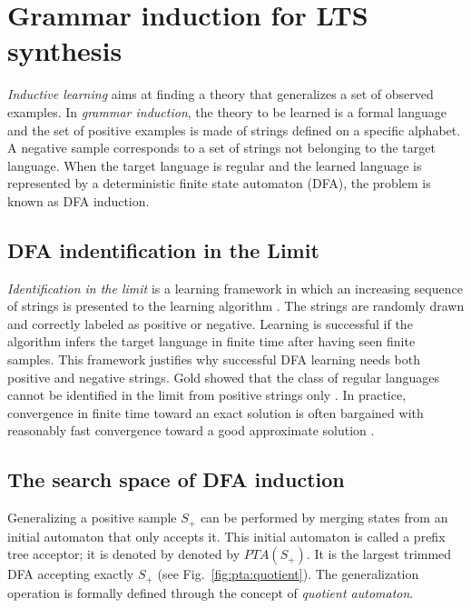\section{Grammar induction for LTS synthesis\label{section:inductive-background}}

\emph{Inductive learning} aims at finding a theory that generalizes a set of observed examples. In \emph{grammar induction}, the theory to be learned is a formal language and the set of positive examples is made of strings defined on a specific alphabet. A negative sample corresponds to a set of strings not belonging to the target language. When the target language
is regular and the learned language is represented by a deterministic finite state automaton (DFA), the problem is known as DFA induction.

\subsection{DFA indentification in the Limit}

\emph{Identification in the limit} is a learning framework in which an increasing sequence of strings is presented to the learning algorithm \cite{Gold:1967}. The strings are randomly drawn and correctly labeled as positive or negative. Learning is successful if the algorithm infers the target language in finite time after having seen finite samples. This framework justifies why successful DFA learning needs both positive and negative strings. Gold showed that the class of regular languages cannot be identified in the limit from positive strings only \cite{Gold:1967}. In practice, convergence in finite time toward an exact solution is often bargained with reasonably fast convergence toward a good approximate solution \cite{Lang:1992}.

\subsection{The search space of DFA induction\label{subsection:gi-background-search-space}}

Generalizing a positive sample $S_+$ can be performed by merging states from an initial automaton that only accepts it.  This initial automaton is called a prefix tree acceptor; it is denoted by denoted by $PTA(S_+)$. It is the largest trimmed DFA accepting exactly $S_+$ (see Fig.~\ref{fig:pta:quotient}). The generalization operation is formally defined through the concept of \emph{quotient automaton}.

